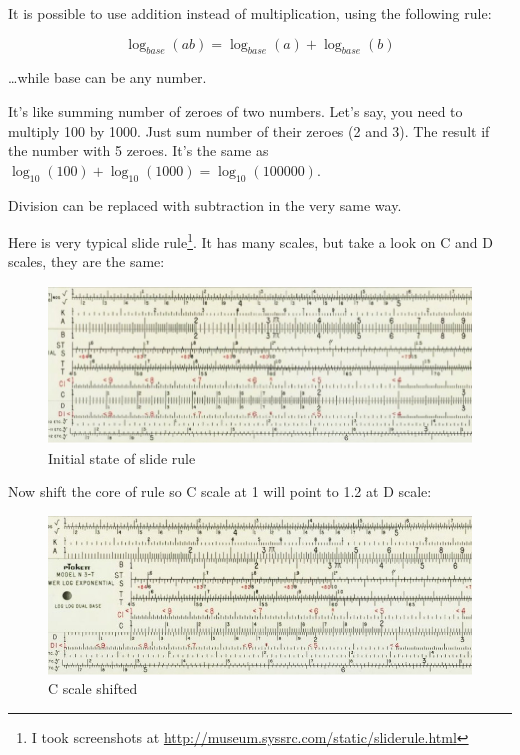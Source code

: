 
It is possible to use addition instead of multiplication, using the following rule:

\begin{equation} \label{eq:1}
\log_{base} (ab) = \log_{base} (a) + \log_{base}(b)
\end{equation}

\dots while base can be any number.

It's like summing number of zeroes of two numbers. Let's say, you need to multiply 100 by 1000. Just sum number of their zeroes (2 and 3).
The result if the number with 5 zeroes. It's the same as $\log_{10} (100) + \log_{10} (1000) = \log_{10} (100000)$.

Division can be replaced with subtraction in the very same way.

\leveldown{}


Here is very typical slide rule\footnote{I took screenshots at \url{http://museum.syssrc.com/static/sliderule.html}}.
It has many scales, but take a look on C and D scales, they are the same:

\begin{figure}[H]
\centering
\includegraphics[scale=0.66]{log/sliderule1.jpg}
\caption{Initial state of slide rule}
\end{figure}

Now shift the core of rule so C scale at 1 will point to 1.2 at D scale:

\begin{figure}[H]
\centering
\includegraphics[scale=0.66]{log/sliderule2.jpg}
\caption{C scale shifted}
\end{figure}

